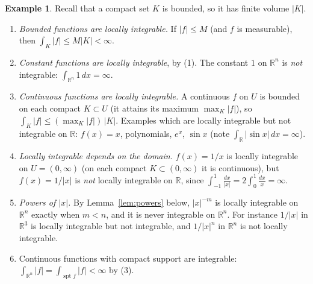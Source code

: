 \documentclass[11pt]{article}
\theoremstyle{plain}
\theoremstyle{definition}
\newtheorem{example}[theorem]{Example}
\theoremstyle{remark}
\begin{document}
\begin{example}\label{ex:locint}
Recall that a compact set $K$ is bounded, so it has finite volume $|K|$.
\begin{enumerate}
    \item \emph{Bounded functions are locally integrable.} If $|f| \leq M$ (and $f$ is measurable), then $\int_K |f| \leq M |K| < \infty$.
    \item \emph{Constant functions are locally integrable}, by (1). The constant $1$ on $\mathbb{R}^n$ is \emph{not} integrable: $\int_{\mathbb{R}^n} 1\, dx = \infty$.
    \item \emph{Continuous functions are locally integrable.} A continuous $f$ on $U$ is bounded on each compact $K \subset U$ (it attains its maximum $\max_K |f|$), so $\int_K |f| \leq (\max_K|f|)\,|K|$. Examples which are locally integrable but not integrable on $\mathbb{R}$: $f(x) = x$, polynomials, $e^x$, $\sin x$ (note $\int_{\mathbb{R}} |\sin x|\, dx = \infty$).
    \item \emph{Locally integrable depends on the domain.} $f(x) = 1/x$ is locally integrable on $U = (0,\infty)$ (on each compact $K \subset (0,\infty)$ it is continuous), but $f(x) = 1/|x|$ is \emph{not} locally integrable on $\mathbb{R}$, since $\int_{-1}^1 \frac{dx}{|x|} = 2\int_0^1 \frac{dx}{x} = \infty$.
    \item \emph{Powers of $|x|$.} By Lemma~\ref{lem:powers} below, $|x|^{-m}$ is locally integrable on $\mathbb{R}^n$ exactly when $m < n$, and it is never integrable on $\mathbb{R}^n$. For instance $1/|x|$ in $\mathbb{R}^3$ is locally integrable but not integrable, and $1/|x|^n$ in $\mathbb{R}^n$ is not locally integrable.
    \item Continuous functions with compact support are integrable: $\int_{\mathbb{R}^n} |f| = \int_{\operatorname{spt} f} |f| < \infty$ by (3).
\end{enumerate}
\end{example}
\end{document}

